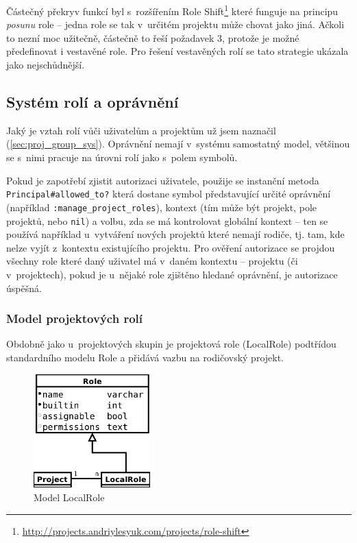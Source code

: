 \documentclass[thesis=B,czech]{FITthesis}[2012/05/02]
\begin{document}
Částečný překryv funkcí byl s~rozšířením Role Shift\footnote{\url{http://projects.andriylesyuk.com/projects/role-shift}}
které funguje na principu \emph{posunu} role -- jedna role se tak
v~určitém projektu může chovat jako jiná. Ačkoli to nezní moc užitečně,
částečně to řeší požadavek 3, protože je možné předefinovat i vestavěné
role. Pro řešení vestavěných rolí se tato strategie ukázala jako
nejschůdnější.

\subsection{Systém rolí a oprávnění}

Jaký je vztah rolí vůči uživatelům a projektům už jsem naznačil
(\ref{sec:proj_group_sys}). Oprávnění nemají v~systému samostatný model,
většinou se s~nimi pracuje na úrovni rolí jako s~polem symbolů.

Pokud je zapotřebí zjistit autorizaci uživatele, použije se instanční
metoda \lstinline!Principal#allowed_to?! která dostane symbol
představující určité oprávnění (například
\lstinline!:manage_project_roles!), kontext (tím může být projekt, pole
projektů, nebo \lstinline!nil!) a volbu, zda se má kontrolovat globální
kontext -- ten se používá například u~vytváření nových projektů které
nemají rodiče, tj. tam, kde nelze vyjít z~kontextu existujícího
projektu. Pro ověření autorizace se projdou všechny role které daný
uživatel má v~daném kontextu -- projektu (či v~projektech), pokud je
u~nějaké role zjištěno hledané oprávnění, je autorizace úspěšná.

\subsubsection{Model projektových rolí}

Obdobně jako u~projektových skupin je projektová role (LocalRole)
podtřídou standardního modelu Role a přidává vazbu na rodičovský
projekt.

\begin{figure}[htbp]
\centering
\includegraphics[width=0.4\textwidth]{role-er1.pdf}
\caption{Model LocalRole}
\end{figure}
\end{document}
